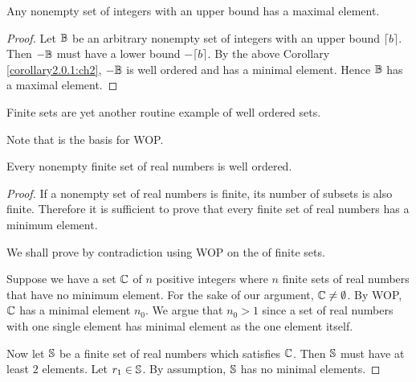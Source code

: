 \begin{cor}
    Any nonempty set of integers with an upper bound has a maximal element.
\end{cor}

\begin{proof} \label{corollary2.0.2:ch2}
    Let $\mathbb{B}$ be an arbitrary nonempty set of integers with an upper
    bound $\lceil b \rceil$. Then $-\mathbb{B}$ must have a lower bound $-\lceil b \rceil$.
    By the above Corollary \ref{corollary2.0.1:ch2}, $-\mathbb{B}$ is well ordered and has
    a minimal element. Hence $\mathbb{B}$ has a maximal element.
\end{proof}

Finite sets are yet another routine example of well ordered sets.

\begin{ab}
    Note that  is the basis for WOP.
\end{ab}

\begin{lemNotes}
    Every nonempty finite set of real numbers is well ordered.
\end{lemNotes}

\begin{proof}
    If a nonempty set of real numbers is finite, its number of subsets is also finite.
    Therefore it is sufficient to prove that every finite set of real numbers has a minimum element.

    We shall prove by contradiction using WOP on the  of finite sets.

    Suppose we have a set $\mathbb{C}$ of $n$ positive integers where $n$ finite
    sets of real numbers that have no minimum element. For the sake of our argument,
    $\mathbb{C} \neq \emptyset$. By WOP, $\mathbb{C}$ has a minimal element $n_0$. We argue
    that $n_0 > 1$ since a set of real numbers with one single element has
    minimal element as the one element itself.

    Now let $\mathbb{S}$ be a finite set of real numbers which satisfies
    $\mathbb{C}$. Then $\mathbb{S}$ must have at least $2$ elements. Let $r_1 \in \mathbb{S}$.
    By assumption, $\mathbb{S}$ has no minimal elements.
\end{proof}
